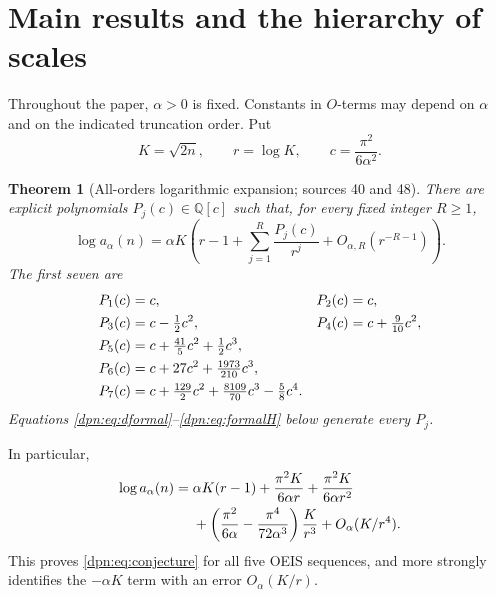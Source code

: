 \documentclass[11pt]{article}
\numberwithin{equation}{section}
\newtheorem{theorem}{Theorem}[section]
\theoremstyle{definition}\newtheorem{definition}[theorem]{Definition}
\theoremstyle{remark}\newtheorem{remark}[theorem]{Remark}
\begin{document}
\section{Main results and the hierarchy of scales}
Throughout the paper, $\alpha>0$ is fixed. Constants in $O$-terms may depend on
$\alpha$ and on the indicated truncation order. Put
\begin{equation}\label{dpn:eq:Kr}
 K=\sqrt{2n},\qquad r=\log K,\qquad c=\frac{\pi^2}{6\alpha^2}.
\end{equation}

\begin{theorem}[All-orders logarithmic expansion; sources 40 and 48]\label{dpn:thm:log}
There are explicit polynomials $P_j(c)\in\mathbb Q[c]$ such that, for every
fixed integer $R\ge1$,
\begin{equation}\label{dpn:eq:logall}
 \log a_\alpha(n)=\alpha K\left(r-1+
       \sum_{j=1}^R\frac{P_j(c)}{r^j}
       +O_{\alpha,R}(r^{-R-1})\right).
\end{equation}
The first seven are
\begin{align}
 P_1(c)&=c,&P_2(c)&=c,\notag\\
 P_3(c)&=c-\tfrac12c^2,&
 P_4(c)&=c+\tfrac9{10}c^2,\notag\\
 P_5(c)&=c+\tfrac{41}5c^2+\tfrac12c^3,\label{dpn:eq:P}\\
 P_6(c)&=c+27c^2+\tfrac{1973}{210}c^3,\notag\\
 P_7(c)&=c+\tfrac{129}2c^2+\tfrac{8109}{70}c^3-\tfrac58c^4.\notag
\end{align}
Equations \eqref{dpn:eq:dformal}--\eqref{dpn:eq:formalH} below generate every $P_j$.
\end{theorem}
In particular,
\begin{align}\label{dpn:eq:firstterms}
 \log a_\alpha(n)
 ={}&\alpha K(r-1)+\frac{\pi^2K}{6\alpha r}
     +\frac{\pi^2K}{6\alpha r^2}\notag\\
 &+\left(\frac{\pi^2}{6\alpha}-\frac{\pi^4}{72\alpha^3}\right)
       \frac K{r^3}+O_\alpha(K/r^4).
\end{align}
This proves \eqref{dpn:eq:conjecture} for all five OEIS sequences, and more strongly
identifies the $-\alpha K$ term with an error $O_\alpha(K/r)$.
\end{document}
